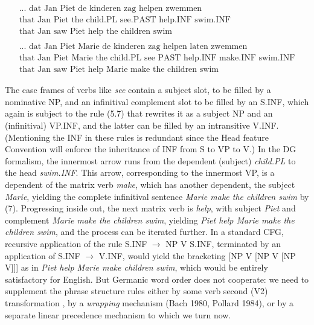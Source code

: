 \begin{eqnarray}
\mbox{ }\\
\mbox{... dat Jan Piet de kinderen zag helpen zwemmen}\nonumber \\
\mbox{that Jan Piet the child.PL see.PAST help.INF swim.INF}\nonumber \\
\mbox{that Jan saw Piet help the children swim}\nonumber\\
\mbox{ }\nonumber\\
\mbox{... dat Jan Piet Marie de kinderen zag helpen laten zwemmen}\nonumber \\
\mbox{that Jan Piet Marie the child.PL see PAST help.INF make.INF swim.INF}\nonumber \\
\mbox{that Jan saw Piet help Marie make the children swim}\nonumber
\end{eqnarray}

\noindent 
The case frames of verbs like {\it see} contain a subject slot, to be filled
by a nominative NP, and an infinitival complement slot to be filled by an
S.INF, which again is subject to the rule (5.7) that rewrites it as a subject
NP and an (infinitival) VP.INF, and the latter can be filled by an
intransitive V.INF. (Mentioning the INF in these rules is redundant since the
Head feature Convention will enforce the inheritance of INF from S to VP to
V.) In the DG formalism, the innermost arrow runs from the dependent (subject)
{\it child.PL} to the head {\it swim.INF}. This arrow, corresponding to the
innermost VP, is a dependent of the matrix verb {\it make}, which has another
dependent, the subject {\it Marie}, yielding the complete infinitival sentence
{\it Marie make the children swim} by (7).  Progressing inside out, the next
matrix verb is {\it help}, with subject {\it Piet} and complement {\it Marie
  make the children swim}, yielding {\it Piet help Marie make the children
  swim}, and the process can be iterated further.  In a standard CFG,
recursive application of the rule S.INF $\rightarrow$ NP V S.INF, terminated
by an application of S.INF $\rightarrow$ V.INF, would yield the bracketing [NP
  V [NP V [NP V]]] as in {\it Piet help Marie make children swim}, which would
be entirely satisfactory for English. But Germanic word order does not
cooperate: we need to supplement the phrase structure rules either by some
verb second (V2) transformation \cite{Besten:1985}, by a {\it wrapping}
mechanism (Bach 1980, Pollard 1984),\nocite{Bach:1980}\nocite{Pollard:1984} or
by a separate linear precedence mechanism to which we turn now.

